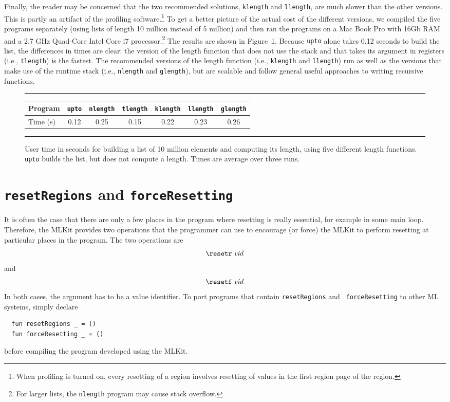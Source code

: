 \documentclass[12pt]{book}
\begin{document}
Finally, the reader may be concerned that the two recommended
solutions, {\tt klength} and {\tt llength}, are much slower than the
other versions. This is partly an artifact of the profiling
software.\footnote{When profiling is turned on, every resetting of a
  region involves resetting of values in the first region page of the
  region.} To get a better picture of the actual cost of the different
versions, we compiled the five programs separately (using lists of
length 10 million instead of 5 million) and then ran the programs on a
Mac Book Pro with 16Gb RAM and a 2,7 GHz Quad-Core Intel Core i7
processor.\footnote{For larger lists, the \texttt{nlength} program may
  cause stack overflow.}  The results are shown in
Figure~\ref{length.timing.fig}. Because {\tt upto} alone takes 0.12
seconds to build the list, the differences in times are clear: the
version of the length function that does not use the stack and that
takes its argument in registers (i.e., \texttt{tlength}) is the
fastest. The recommended versions of the length function (i.e.,
\texttt{klength} and \texttt{llength}) run as well as the versions
that make use of the runtime stack (i.e., \texttt{nlength} and
\texttt{glength}), but are scalable and follow general useful
approaches to writing recursive functions.

\begin{figure}
\hrule
\medskip
\begin{center}
\def\arraystretch{1.4}
\begin{tabular}{l|cccccc}
Program      & {\tt upto} & {\tt nlength} & {\tt tlength} & {\tt klength} & {\tt llength} & {\tt glength} \\ \hline
Time (s) & 0.12 & 0.25 & 0.15 & 0.22 & 0.23 & 0.26
\end{tabular}
\end{center}
\caption{User time in seconds for building a list of 10 million elements and
computing its length, using five different length functions. {\tt upto} builds
the list, but does not compute a length. Times are average
over three runs.}
\label{length.timing.fig}
\medskip
\hrule
\end{figure}

\section{\texttt{resetRegions} and \texttt{forceResetting}}
It is often the case that there are only a few places in the program
where resetting is really essential, for example in some main loop.
Therefore, the MLKit provides two operations that the programmer can use
to encourage (or force) the MLKit to perform resetting at particular
places in the program. The two operations are
$$\resetr\; {\it vid}$$
and 
$$\resetf\; {\it vid}$$
In both cases, the argument has to be a value
identifier.  To port programs that contain {\tt resetRegions} and {\tt
  forceResetting} to other ML systems, simply declare
\begin{verbatim}
  fun resetRegions _ = ()
  fun forceResetting _ = ()
\end{verbatim}
before compiling the program developed using the MLKit.
\end{document}
